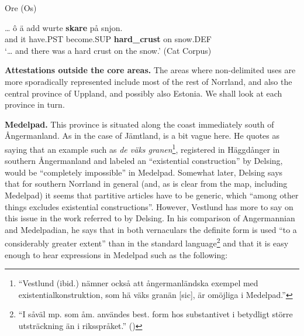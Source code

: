 
\item 

Ore (Os)



 \ea\label{}
\gll …  ô  ä  add  wurte  \textbf{skare} på  snjon.\\


  and  it  have.PST  become.SUP  \textbf{hard\_crust} on  snow.DEF\\

\glt ‘… and there was a hard crust on the snow.’ (Cat Corpus)

\z

\textbf{Attestations outside the core areas.} The areas where non-delimited uses are more sporadically represented include most of the rest of Norrland, and also the central province of Uppland, and possibly also Estonia. We shall look at each province in turn.


\textbf{Medelpad.} This province is situated along the coast immediately south of Ångermanland. As in the case of Jämtland, \citet[19]{Delsing2003a} is a bit vague here. He quotes \citet[21]{Vestlund1923} as saying that an example such as \textit{de väks granen}\footnote{ “Vestlund (ibid.) nämner också att ångermanländska exempel med existentialkonstruktion, som hä väks granän [sic], är omöjliga i Medelpad.”}, registered in Häggdånger in southern Ångermanland and labeled an “existential construction” by Delsing, would be “completely impossible” in Medelpad. Somewhat later, Delsing says that for southern Norrland in general (and, as is clear from the map, including Medelpad) it seems that partitive articles have to be generic, which “among other things excludes existential constructions”. However, Vestlund has more to say on this issue in the work referred to by Delsing. In his comparison of Angermannian and Medelpadian, he says that in both vernaculars the definite form is used “to a considerably greater extent” than in the standard language\footnote{ “I såväl mp. som åm. användes best. form hos substantivet i betydligt större utsträckning än i riksspråket.” (\citet[20]{Vestlund1923})} and that it is easy enough to hear expressions in Medelpad such as the following:

